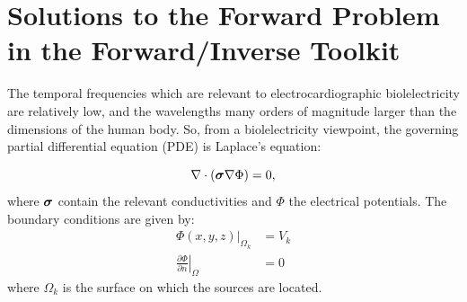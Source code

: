 \documentclass[fleqn,11pt,openany]{book}
\newcommand{\BM }[1]{\mbox{\boldmath $#1$}}
\begin{document}
\section{Solutions to the Forward Problem in the Forward/Inverse Toolkit}

The temporal frequencies which are relevant to electrocardiographic
biolelectricity are relatively low, and the wavelengths many orders of
magnitude larger than the dimensions of the human body. So, from a
biolelectricity viewpoint, the governing partial differential equation (PDE)
is Laplace's equation:

\begin{equation} \nabla \cdot (\BM{\sigma} \nabla \Phi) = 0, \label{eq:eq}
\end{equation}
\noindent where $\BM{\sigma}$ contain the relevant conductivities and $\Phi$ the
electrical potentials. The boundary conditions are given by:
\begin{align} \Phi(x,y,z)|_{\Omega_k} &= V_k\\ \left. \frac{\partial
\Phi}{\partial n} \right|_\Omega &= 0 \label{eq:bc}
\end{align}
\noindent where $\Omega_{k}$ is the surface on which the sources are located.
\end{document}

